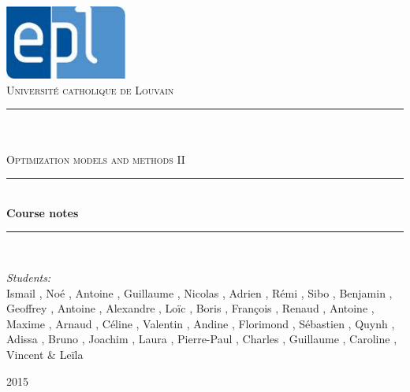 \newcommand{\HRule}{\rule{\linewidth}{0.5mm}}

\begin{titlepage}
	
\begin{center}

\includegraphics[width=0.30\textwidth]{images/epl.jpg}\\[1cm]    

\textsc{\LARGE Universit\'e catholique de Louvain}\\[1.5cm]

\HRule \\[0.5cm]

\textsc{\Large {}}\\[0.2cm]
\textsc{\Large Optimization models and methods II}\\[0.5cm]


\HRule \\[2cm]
{\huge \bfseries Course notes}\\[1cm]

\HRule \\[1.5cm]

\begin{minipage}{0.8\textwidth}
\large
\emph{Students:}\\
Ismail , Noé , Antoine , Guillaume , Nicolas , Adrien , Rémi , Sibo , Benjamin , Geoffrey , Antoine , Alexandre , Loïc , Boris , François , Renaud , Antoine , Maxime , Arnaud ,  Céline , Valentin , Andine , Florimond , Sébastien , Quynh , Adissa , Bruno , Joachim , Laura , Pierre-Paul , Charles , Guillaume , Caroline , Vincent   \& Leïla 
\end{minipage}


\vfill

{\large  2015}

\end{center}	
	
	
\end{titlepage}

